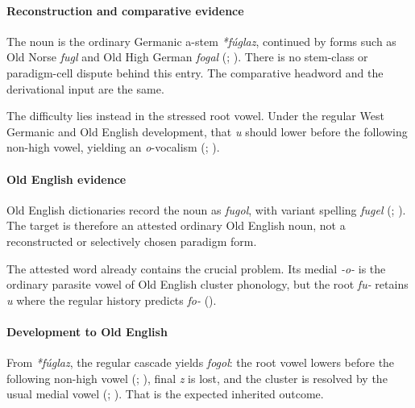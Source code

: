 \documentclass[
  british,
  a4paper,
]{article}
\begin{document}
\paragraph{Reconstruction and comparative
evidence}\label{reconstruction-and-comparative-evidence-73}

The noun is the ordinary Germanic a-stem \emph{*fúglaz}, continued by
forms such as Old Norse \emph{fugl} and Old High German \emph{fogal}
(;
). There is no stem-class or
paradigm-cell dispute behind this entry. The comparative headword and
the derivational input are the same.

The difficulty lies instead in the stressed root vowel. Under the
regular West Germanic and Old English development, that \emph{u} should
lower before the following non-high vowel, yielding an \emph{o}-vocalism
(;
).

\paragraph{Old English evidence}\label{old-english-evidence-73}

Old English dictionaries record the noun as \emph{fugol}, with variant
spelling \emph{fugel} (; ).
The target is therefore an attested ordinary Old English noun, not a
reconstructed or selectively chosen paradigm form.

The attested word already contains the crucial problem. Its medial
\emph{-o-} is the ordinary parasite vowel of Old English cluster
phonology, but the root \emph{fu-} retains \emph{u} where the regular
history predicts \emph{fo-} ().

\paragraph{Development to Old
English}\label{development-to-old-english-73}

From \emph{*fúglaz}, the regular cascade yields \emph{fogol}: the root
vowel lowers before the following non-high vowel
(;
), final \emph{z} is lost,
and the cluster is resolved by the usual medial vowel
(;
). That is the expected
inherited outcome.
\end{document}
